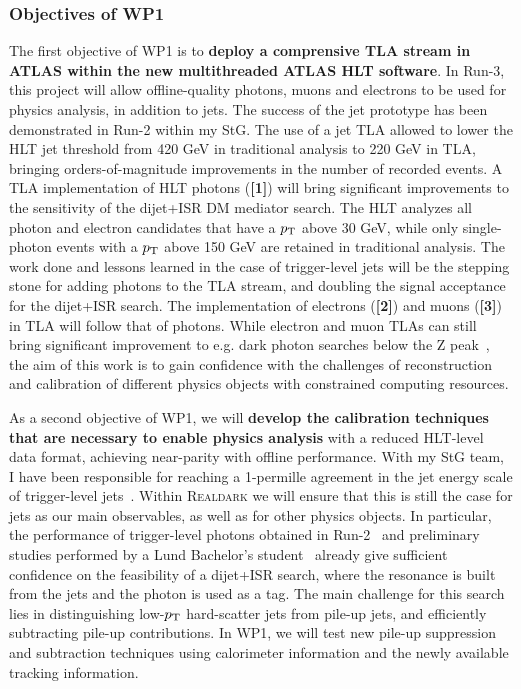 
\subsubsection{Objectives of WP1}

The first objective of WP1 is to \textbf{deploy a comprensive TLA stream in ATLAS within the new multithreaded ATLAS HLT software}. %
In Run-3, this project will allow offline-quality photons, muons and electrons to be used for physics analysis, in addition to jets. 
The success of the jet prototype has been demonstrated in Run-2 within my StG. 
The use of a jet TLA allowed to lower the HLT jet threshold from 420 GeV in traditional analysis to 220 GeV in TLA, bringing orders-of-magnitude improvements in the number of recorded events. 
A TLA implementation of HLT photons (\textbf{[1]}) will bring significant improvements to the sensitivity of the dijet+ISR DM mediator search. 
The HLT analyzes all photon and electron candidates that have a $p_{\rm{T}}$ above 30 GeV, 
while only single-photon events with a $p_{\rm{T}}$ above 150 GeV are retained in traditional analysis. 
The work done and lessons learned in the case of trigger-level jets will be the stepping stone for adding photons to the TLA stream, 
and doubling the signal acceptance for the dijet+ISR search. 
The implementation of electrons (\textbf{[2]}) and muons (\textbf{[3]}) in TLA will follow that of photons.
While electron and muon TLAs can still bring significant improvement to e.g. dark photon searches below the Z peak~\cite{ToBeCited}, %
the aim of this work is to gain confidence with the challenges of reconstruction and calibration of different physics objects with constrained computing resources. 

As a second objective of WP1, we will \textbf{develop the calibration techniques that are necessary to enable physics analysis} with a reduced HLT-level data format, achieving near-parity with offline performance. 
With my StG team, I have been responsible for reaching a 1-permille agreement in the jet energy scale of trigger-level jets~\cite{ToBeCited}.%
Within \textsc{Realdark} we will ensure that this is still the case for jets as our main observables, as well as for other physics objects. 
In particular, the performance of trigger-level photons obtained in Run-2~\cite{ToBeCited} %
and preliminary studies performed by a Lund Bachelor’s student~\cite{ToBeCited}%
already give sufficient confidence on the feasibility of a dijet+ISR search, where the resonance is built from the jets and the photon is used as a tag. 
The main challenge for this search lies in distinguishing low-$p_{\rm{T}}$ hard-scatter jets from pile-up jets, and efficiently subtracting pile-up contributions. 
In WP1, we will test new pile-up suppression and subtraction techniques using calorimeter information and the newly available tracking information. 

